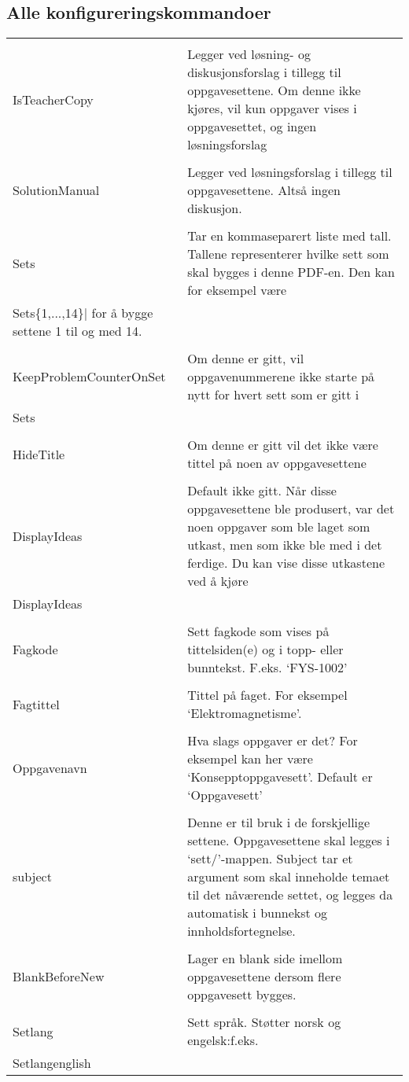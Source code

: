 \documentclass{article}
\begin{document}
\subsection*{Alle konfigureringskommandoer}
\begin{tabularx}{\textwidth}{lX}
	\lstinline{\\IsTeacherCopy}&
	Legger ved løsning- og diskusjonsforslag i tillegg til oppgavesettene. Om denne ikke kjøres, vil kun oppgaver vises i oppgavesettet, og ingen løsningsforslag\\
	\lstinline{\\SolutionManual}&Legger ved løsningsforslag i tillegg til oppgavesettene. Altså ingen diskusjon.\\
	\lstinline{\\Sets}&Tar en kommaseparert liste med tall. Tallene representerer hvilke sett som skal bygges i denne PDF-en. Den kan for eksempel være \lstinline|\\Sets\{1,...,14\}| for å bygge settene 1 til og med 14.\\
	\lstinline{\\KeepProblemCounterOnSet}&Om denne er gitt, vil oppgavenummerene ikke starte på nytt for hvert sett som er gitt i \lstinline{\\Sets}. \\
	\lstinline{\\HideTitle}&Om denne er gitt vil det ikke være tittel på noen av oppgavesettene\\
	\lstinline{\\DisplayIdeas}&Default ikke gitt. Når disse oppgavesettene ble produsert, var det noen oppgaver som ble laget som utkast, men som ikke ble med i det ferdige. Du kan vise disse utkastene ved å kjøre \lstinline{\\DisplayIdeas} i config.tex.\\
	\lstinline{\\Fagkode}&Sett fagkode som vises på tittelsiden(e) og i topp- eller bunntekst. F.eks. `FYS-1002'\\
	\lstinline{\\Fagtittel}&Tittel på faget. For eksempel `Elektromagnetisme'.\\
	\lstinline{\\Oppgavenavn}&Hva slags oppgaver er det? For eksempel kan her være `Konsepptoppgavesett'. Default er `Oppgavesett'\\
	\lstinline{\\subject}&Denne er til bruk i de forskjellige settene. Oppgavesettene skal legges i `sett/'-mappen.
												Subject tar et argument som skal inneholde temaet til det nåværende settet, og legges da automatisk i bunnekst og innholdsfortegnelse.\\
	\lstinline{\\BlankBeforeNew}&Lager en blank side imellom oppgavesettene dersom flere oppgavesett bygges.\\
	\lstinline{\\Setlang}&Sett språk. Støtter norsk og engelsk:f.eks. \lstinline{\\Setlang{english}}. Norsk er standard.

\end{tabularx}
\end{document}
